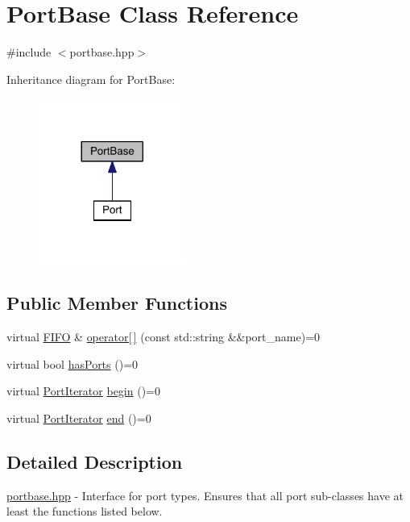 \hypertarget{class_port_base}{}\section{Port\+Base Class Reference}
\label{class_port_base}


{\ttfamily \#include $<$portbase.\+hpp$>$}



Inheritance diagram for Port\+Base\+:
\nopagebreak
\begin{figure}[H]
\begin{center}
\leavevmode
\includegraphics[width=137pt]{class_port_base__inherit__graph}
\end{center}
\end{figure}
\subsection*{Public Member Functions}
\begin{DoxyCompactItemize}
\item 
virtual \hyperlink{class_f_i_f_o}{F\+I\+FO} \& \hyperlink{class_port_base_ad034502b053f3cd7939d651b2d72cd0a}{operator\mbox{[}$\,$\mbox{]}} (const std\+::string \&\&port\+\_\+name)=0
\item 
virtual bool \hyperlink{class_port_base_a29870b5e201f46a806d2269d7f4635dc}{has\+Ports} ()=0
\item 
virtual \hyperlink{class_port_iterator}{Port\+Iterator} \hyperlink{class_port_base_afc54c92e3b9d1967e8a8c7e74d7507d3}{begin} ()=0
\item 
virtual \hyperlink{class_port_iterator}{Port\+Iterator} \hyperlink{class_port_base_a50427e7a1beea0d5111ccc81ee418178}{end} ()=0
\end{DoxyCompactItemize}


\subsection{Detailed Description}
\hyperlink{portbase_8hpp_source}{portbase.\+hpp} -\/ Interface for port types. Ensures that all port sub-\/classes have at least the functions listed below.

